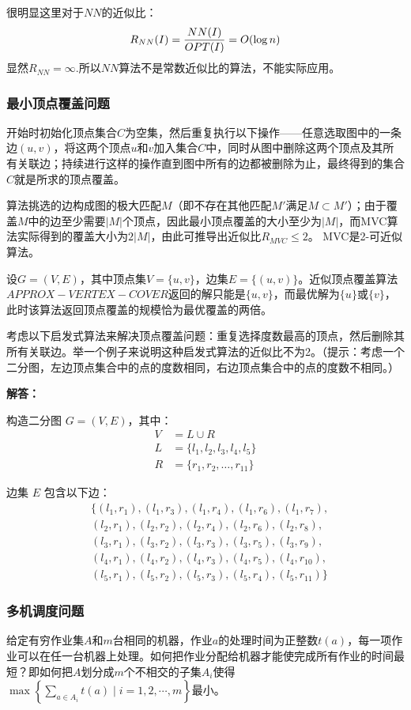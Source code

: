 \documentclass[./../main.tex]{subfiles} %
\begin{document}
很明显这里对于$NN$的近似比：
$$
R_{NN}(I)=\frac{NN(I)}{OPT(I)}=O(\log n)\\
$$
显然$R_{NN}=\infty$.所以$NN$算法不是常数近似比的算法，不能实际应用。

\subsubsection{最小顶点覆盖问题}
开始时初始化顶点集合$C$为空集，然后重复执行以下操作——任意选取图中的一条边$(u,v)$，将这两个顶点$u$和$v$加入集合$C$中，同时从图中删除这两个顶点及其所有关联边；持续进行这样的操作直到图中所有的边都被删除为止，最终得到的集合$C$就是所求的顶点覆盖。

算法挑选的边构成图的极大匹配$M$（即不存在其他匹配$M'$满足$M \subset M'$）；由于覆盖$M$中的边至少需要$|M|$个顶点，因此最小顶点覆盖的大小至少为$|M|$，而MVC算法实际得到的覆盖大小为$2|M|$，由此可推导出近似比$R_{MVC} \leq 2$。
MVC是2-可近似算法。

设$G=(V, E)$，其中顶点集$V = \{u, v\}$，边集$E = \{(u, v)\}$。近似顶点覆盖算法$APPROX-VERTEX-COVER$返回的解只能是$\{u, v\}$，而最优解为$\{u\}$或$\{v\}$，此时该算法返回顶点覆盖的规模恰为最优覆盖的两倍。

考虑以下启发式算法来解决顶点覆盖问题：重复选择度数最高的顶点，然后删除其所有关联边。举一个例子来说明这种启发式算法的近似比不为2。（提示：考虑一个二分图，左边顶点集合中的点的度数相同，右边顶点集合中的点的度数不相同。）

\textbf{解答：}

构造二分图 $G=(V,E)$，其中：
\begin{align*}
V &= L \cup R \\
L &= \{l_1, l_2, l_3, l_4, l_5\} \\
R &= \{r_1, r_2, \ldots, r_{11}\}
\end{align*}

边集 $E$ 包含以下边：
\begin{align*}
&\big\{(l_1,r_1), (l_1,r_3), (l_1,r_4), (l_1,r_6), (l_1,r_7), \\
&(l_2,r_1), (l_2,r_2), (l_2,r_4), (l_2,r_6), (l_2,r_8), \\
&(l_3,r_1), (l_3,r_2), (l_3,r_3), (l_3,r_5), (l_3,r_9), \\
&(l_4,r_1), (l_4,r_2), (l_4,r_3), (l_4,r_5), (l_4,r_{10}), \\
&(l_5,r_1), (l_5,r_2), (l_5,r_3), (l_5,r_4), (l_5,r_{11})\big\}
\end{align*}

\subsubsection{多机调度问题}
给定有穷作业集$A$和$m$台相同的机器，作业$a$的处理时间为正整数$t(a)$，每一项作业可以在任一台机器上处理。如何把作业分配给机器才能使完成所有作业的时间最短？即如何把$A$划分成$m$个不相交的子集$A_{i}$使得$\max\left\{\sum_{a\in A_{i}}t(a)\mid i=1,2,\cdots, m\right\}$最小。
\end{document}
